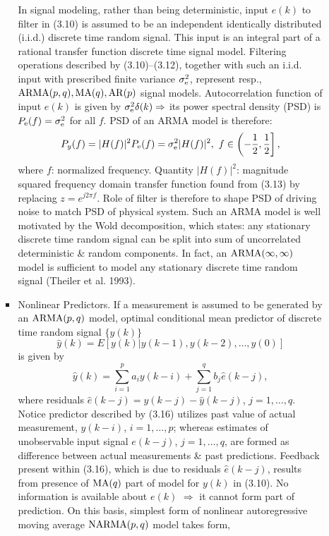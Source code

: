\documentclass{article}
\begin{document}
\begin{enumerate}
\begin{itemize}
\begin{itemize}
			In signal modeling, rather than being deterministic, input $e(k)$ to filter in (3.10) is assumed to be an independent identically distributed (i.i.d.) discrete time random signal. This input is an integral part of a rational transfer function discrete time signal model. Filtering operations described by (3.10)--(3.12), together with such an i.i.d. input with prescribed finite variance $\sigma_{\rm e}^2$, represent resp., ${\rm ARMA}(p,q),{\rm MA}(q),{\rm AR}(p)$ signal models. Autocorrelation function of input $e(k)$ is given by $\sigma_{\rm e}^2\delta(k)\Rightarrow$ its power spectral density (PSD) is $P_{\rm e}(f) = \sigma_{\rm e}^2$ for all $f$. PSD of an ARMA model is therefore:
			\begin{equation}
				P_y(f) = |H(f)|^2P_{\rm e}(f) = \sigma_{\rm e}^2|H(f)|^2,\ f\in\left(-\frac{1}{2},\frac{1}{2}\right],
			\end{equation}
			where $f$: normalized frequency. Quantity $|H(f)|^2$: magnitude squared frequency domain transfer function found from (3.13) by replacing $z = e^{j2\pi f}$. Role of filter is therefore to shape PSD of driving noise to match PSD of physical system. Such an ARMA model is well motivated by the Wold decomposition, which states: any stationary discrete time random signal can be split into sum of uncorrelated deterministic \& random components. In fact, an ${\rm ARMA}(\infty,\infty)$ model is sufficient to model any stationary discrete time random signal (Theiler et al. 1993).
			\item {\sf Nonlinear Predictors.} If a measurement is assumed to be generated by an ${\rm ARMA}(p,q)$ model, optimal conditional mean predictor of discrete time random signal $\{y(k)\}$
			\begin{equation}
				\hat{y}(k) = E[y(k)|y(k - 1),y(k - 2),\ldots,y(0)]
			\end{equation}
			is given by
			\begin{equation}
				\hat{y}(k) = \sum_{i=1}^p a_iy(k - i) + \sum_{j=1}^q b_j\hat{e}(k - j),
			\end{equation}
			where residuals $\hat{e}(k - j) = y(k - j) - \hat{y}(k - j)$, $j = 1,\ldots,q$. Notice predictor described by (3.16) utilizes past value of actual measurement, $y(k - i)$, $i = 1,\ldots,p$; whereas estimates of unobservable input signal $e(k - j)$, $j = 1,\ldots,q$, are formed as difference between actual measurements \& past predictions. Feedback present within (3.16), which is due to residuals $\hat{e}(k - j)$, results from presence of ${\rm MA}(q)$ part of model for $y(k)$ in (3.10). No information is available about $e(k)$ $\Rightarrow$ it cannot form part of prediction. On this basis, simplest form of nonlinear autoregressive moving average ${\rm NARMA}(p,q)$ model takes form,

\end{itemize}
\end{itemize}
\end{enumerate}
\end{document}
